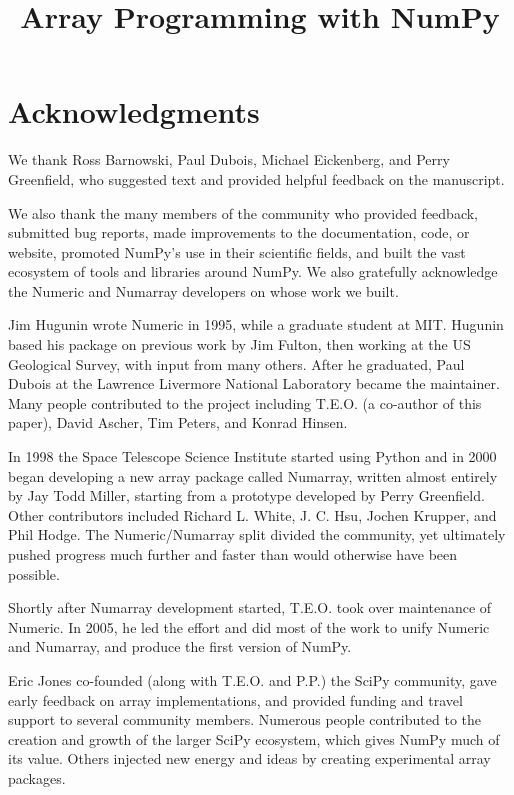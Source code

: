 \documentclass[fleqn,10pt,twocolumn]{wlscirep}
\title{Array Programming with NumPy}
\begin{document}
\flushbottom
\maketitle
\thispagestyle{empty}

%





\section*{Acknowledgments}

We thank Ross Barnowski, Paul Dubois, Michael Eickenberg, and Perry Greenfield, who
suggested text and provided helpful feedback on the manuscript.

We also thank the many members of the community who provided
feedback, submitted bug reports, made improvements to the documentation,
code, or website, promoted NumPy's use in their scientific fields, and built
the vast ecosystem of tools and libraries around NumPy.
We also gratefully acknowledge the Numeric and Numarray developers
on whose work we built.  

Jim Hugunin wrote Numeric in 1995, while a graduate student at MIT.
Hugunin based his package on previous work by Jim Fulton, then working at the
US Geological Survey, with input from many others.
After he graduated, Paul Dubois at the Lawrence Livermore National Laboratory
became the maintainer.
Many people contributed to the project including T.E.O. (a co-author
of this paper), David Ascher, Tim Peters, and Konrad Hinsen.

In 1998 the Space Telescope Science Institute started using Python
and in 2000 began developing a new array package called Numarray, written
almost entirely by Jay Todd Miller, starting from a prototype developed by
Perry Greenfield.  Other contributors included Richard L. White, J. C. Hsu,
Jochen Krupper, and Phil Hodge.
The Numeric/Numarray split divided the community, yet ultimately pushed
progress much further and faster than would otherwise have been possible. 

Shortly after Numarray development started, T.E.O. took over maintenance of
Numeric. In 2005, he led the effort and did most of the work to unify Numeric
and Numarray, and produce the first version of NumPy.

Eric Jones co-founded (along with T.E.O. and P.P.) the SciPy community, gave early feedback on array
implementations, and provided funding and travel support to several
community members.
Numerous people contributed to the creation and
growth of the larger SciPy ecosystem, which gives NumPy much of its
value. Others injected new energy and ideas by creating experimental
array packages.
\end{document}

